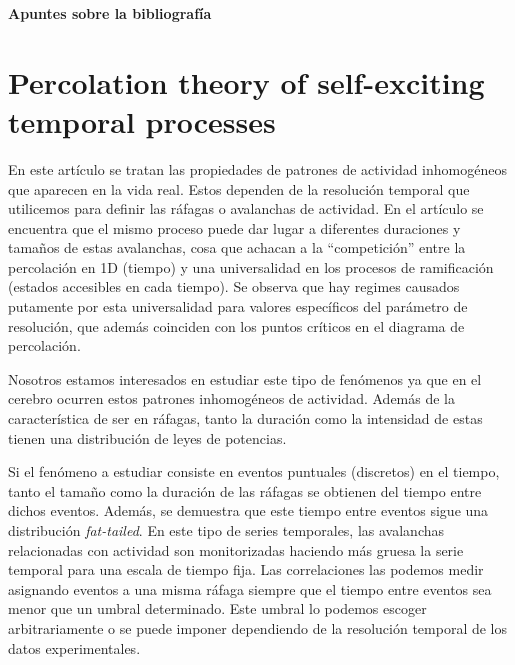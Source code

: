 \documentclass[a4paper,11pt]{book}
\date{}
\date{}
\begin{document}
\begin{center}																		%
\newcommand{\HRule}{\rule{\linewidth}{0.5mm}}									%
	\vspace{0.5\textheight}

    \begin{center}
        \Huge{\textbf{Apuntes sobre la bibliografía}}

    \end{center}
\end{center}
\chapter{Percolation theory of self-exciting temporal processes}

En este artículo se tratan las propiedades de patrones de actividad inhomogéneos que aparecen en la vida real. Estos dependen de la resolución temporal que 
utilicemos para definir las ráfagas o avalanchas de actividad. En el artículo se encuentra que el mismo proceso puede dar lugar a diferentes duraciones 
y tamaños de estas avalanchas, cosa que achacan a la ``competición'' entre la percolación en 1D (tiempo) y una universalidad en los procesos de ramificación
(estados accesibles en cada tiempo). Se observa que hay regimes causados putamente por esta universalidad para valores específicos del parámetro de 
resolución, que además coinciden con los puntos críticos en el diagrama de percolación.

Nosotros estamos interesados en estudiar este tipo de fenómenos ya que en el cerebro ocurren estos patrones inhomogéneos de actividad. Además de la 
característica de ser en ráfagas, tanto la duración como la intensidad de estas tienen una distribución de leyes de potencias.

Si el fenómeno a estudiar consiste en eventos puntuales (discretos) en el tiempo, tanto el tamaño como la duración de las ráfagas se obtienen del tiempo 
entre dichos eventos. Además, se demuestra que este tiempo entre eventos sigue una distribución \textit{fat-tailed}. En este tipo de series temporales, 
las avalanchas relacionadas con actividad son monitorizadas haciendo más gruesa la serie temporal para una escala de tiempo fija. Las correlaciones las podemos 
medir asignando eventos a una misma ráfaga siempre que el tiempo entre eventos sea menor que un umbral determinado. Este umbral lo podemos escoger arbitrariamente
o se puede imponer dependiendo de la resolución temporal de los datos experimentales. 
\end{document}

